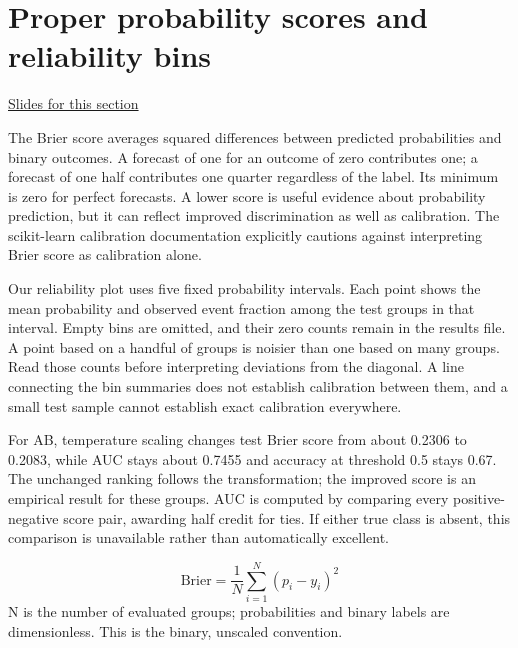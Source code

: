 \documentclass[11pt,letterpaper]{article}
\theoremstyle{definition}\newtheorem{definition}{Definition}\newtheorem{example}{Example}
\numberwithin{equation}{section}
\begin{document}
\section{Proper probability scores and reliability bins}
\hypertarget{note-proper-probability-scores-and-reliability-bins}{}\label{note:proper-probability-scores-and-reliability-bins}
{\small \href{slides.html\#frame=the-brier-score-panel-1\&step=1}{Slides for this section}}\par
The Brier score averages squared differences between predicted probabilities and binary outcomes. A forecast of one for an outcome of zero contributes one; a forecast of one half contributes one quarter regardless of the label. Its minimum is zero for perfect forecasts. A lower score is useful evidence about probability prediction, but it can reflect improved discrimination as well as calibration. The scikit-learn calibration documentation explicitly cautions against interpreting Brier score as calibration alone.

Our reliability plot uses five fixed probability intervals. Each point shows the mean probability and observed event fraction among the test groups in that interval. Empty bins are omitted, and their zero counts remain in the results file. A point based on a handful of groups is noisier than one based on many groups. Read those counts before interpreting deviations from the diagonal. A line connecting the bin summaries does not establish calibration between them, and a small test sample cannot establish exact calibration everywhere.

For AB, temperature scaling changes test Brier score from about 0.2306 to 0.2083, while AUC stays about 0.7455 and accuracy at threshold 0.5 stays 0.67. The unchanged ranking follows the transformation; the improved score is an empirical result for these groups. AUC is computed by comparing every positive-negative score pair, awarding half credit for ties. If either true class is absent, this comparison is unavailable rather than automatically excellent.

\[
\mathrm{Brier}=\frac1N\sum_{i=1}^{N}(p_i-y_i)^2
\]
N is the number of evaluated groups; probabilities and binary labels are dimensionless. This is the binary, unscaled convention.
\end{document}

